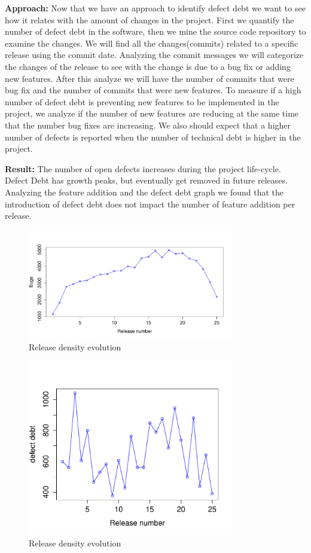 \vspace{1mm}
\noindent\textbf{Approach:} Now that we have an approach to identify defect debt we want to see how it relates with the amount of changes in the project. First we quantify the number of defect debt in the software, then we mine the source code repository to examine the changes. We will find all the changes(commits) related to a specific release using the commit date. Analyzing the commit messages we will categorize the changes of the release to see with the change is due to a bug fix or adding new features. After this analyze we will have the number of commits that were bug fix and the number of commits that were new features. To measure if  a high number of defect debt is preventing new features to be implemented in the project, we analyze if the number of new features are reducing at the same time that the number bug fixes are increasing. We also should expect that a higher number of defects is reported when the number of technical debt is higher in the project.

\vspace{1mm}
\noindent\textbf{Result:} The number of open defects increases during the project life-cycle. Defect Debt has growth peaks, but eventually get removed in future releases. Analyzing the feature addition and the defect debt graph we found that the introduction of defect debt does not impact the number of  feature addition per release. 

\begin{figure}[thb!]
    \caption{Release density evolution}
    \label{fig:release_density}
    \includegraphics[width=90mm,scale=0.5]{figures/number_of_bugs_releases}
\end{figure}

\begin{figure}[thb!]
    \caption{Release density evolution}
    \label{fig:release_density}
    \includegraphics[width=90mm,scale=0.5]{figures/technical_debt}
\end{figure}

